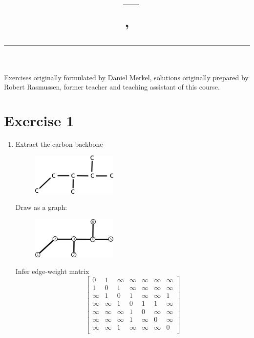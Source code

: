 \documentclass{article}
\title{\begin{flushleft}
		\vspace{-4ex}
		\courseid~--- \coursename \\[0.2cm]
		{\Large \papertitle, \term \\[0.2cm]}
		\hrule
		\vspace{-4ex}
	\end{flushleft}
}
\date{}
\renewcommand{\inf}{\infty}
\begin{document}
\setlength{\baselineskip}{1.25\baselineskip} %
\setlength{\parindent}{0em} %
\maketitle


Exercises originally formulated by Daniel Merkel, solutions originally
prepared by {Robert Rasmussen}, former teacher and teaching assistant of
this course.


\section*{Exercise 1}
\begin{enumerate}[label = (\arabic*)]
	\item Extract the carbon backbone
	
	\begin{figure}[H]
		\centering
		\includegraphics[width=0.4\textwidth]{exercise_1_1}
	\end{figure}
	
	Draw as a graph:

	\begin{figure}[H]
		\centering
		\includegraphics[width=0.4\textwidth]{exercise_1_2}
	\end{figure}
	
	Infer edge-weight matrix
	\[
		\begin{bmatrix}
			0 & 1 & \inf & \inf & \inf & \inf & \inf \\
			1 & 0 & 1 & \inf & \inf & \inf & \inf \\
			\inf & 1 & 0 & 1 & \inf & \inf & 1 \\
			\inf & \inf & 1 & 0 & 1 & 1 & \inf \\
			\inf & \inf & \inf & 1 & 0 & \inf & \inf \\
			\inf & \inf & \inf & 1 & \inf & 0 & \inf \\
			\inf & \inf & 1 & \inf & \inf & \inf & 0 \\
		\end{bmatrix}
	\]
	

\end{enumerate}
\end{document}
